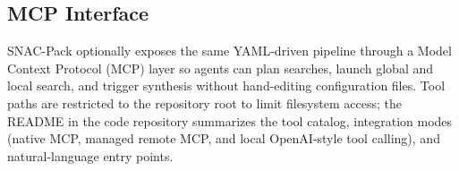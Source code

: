 \documentclass[11pt]{article}
\begin{document}
\subsection{MCP Interface}
SNAC-Pack optionally exposes the same YAML-driven pipeline through a Model Context Protocol (MCP) layer so agents can plan searches, launch global and local search, and trigger synthesis without hand-editing configuration files.
Tool paths are restricted to the repository root to limit filesystem access; the README in the code repository summarizes the tool catalog, integration modes (native MCP, managed remote MCP, and local OpenAI-style tool calling), and natural-language entry points.


\end{document}
